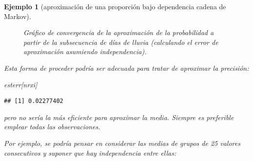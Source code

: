 \documentclass[
]{book}
\newenvironment{Shaded}{\begin{snugshade}}{\end{snugshade}}
\newcommand{\NormalTok}[1]{#1}
\theoremstyle{break}
\newtheorem{example}{Ejemplo}[chapter]
\theoremstyle{nonumberplain}
\begin{document}
\begin{example}[aproximación de una proporción bajo dependencia cadena de Markov]
\begin{figure}[!htb]
\caption{Gráfico de convergencia de la aproximación de la probabilidad a partir de la subsecuencia de días de lluvia (calculando el error de aproximación asumiendo independencia).}\label{fig:conv-dep2}
\end{figure}

Esta forma de proceder podría ser adecuada para tratar de aproximar la precisión:

\begin{Shaded}
\begin{Highlighting}[]
\NormalTok{esterr[nrxi]}
\end{Highlighting}
\end{Shaded}

\begin{verbatim}
## [1] 0.02277402
\end{verbatim}

pero no sería la más eficiente para aproximar la media. Siempre es preferible emplear todas las observaciones.

Por ejemplo, se podría pensar en considerar las medias de grupos de 25 valores consecutivos y suponer que hay independencia entre ellas:


\end{example}
\end{document}
